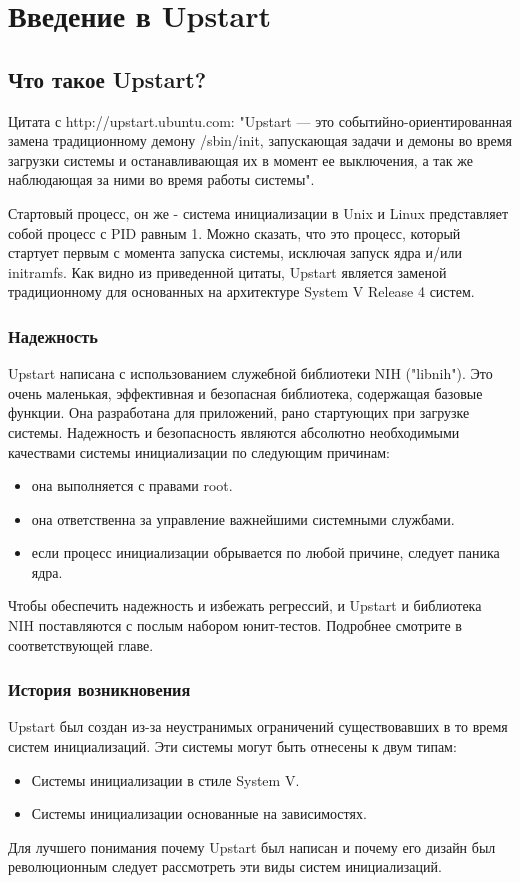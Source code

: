 \chapter{Введение в Upstart} \label{sec:Introduction}

\section{Что такое Upstart?}

Цитата с http://upstart.ubuntu.com: "Upstart --- это событийно-ориентированная замена традиционному демону /sbin/init, запускающая задачи и демоны во время загрузки системы и останавливающая их в момент ее выключения, а так же наблюдающая за ними во время работы системы".

Стартовый процесс, он же - система инициализации в Unix и Linux представляет собой процесс с PID равным 1. Можно сказать, что это процесс, который стартует первым с момента запуска системы, исключая запуск ядра и/или initramfs. Как видно из приведенной цитаты, Upstart является заменой традиционному для основанных на архитектуре System V Release 4 систем.

\subsection{Надежность}

Upstart написана с использованием служебной библиотеки NIH ("libnih"). Это очень маленькая, эффективная и безопасная библиотека, содержащая базовые функции. Она разработана для приложений, рано стартующих при загрузке системы. Надежность и безопасность являются абсолютно необходимыми качествами системы инициализации по следующим причинам:
\begin{itemize}
\item она выполняется с правами root.
\item она ответственна за управление важнейшими системными службами.
\item если процесс инициализации обрывается по любой причине, следует паника ядра.
\end{itemize}
Чтобы обеспечить надежность и избежать регрессий, и Upstart и библиотека NIH поставляются с послым набором юнит-тестов. Подробнее смотрите в соответствующей главе.
\subsection{История возникновения}
Upstart был создан из-за неустранимых ограничений существовавших в то время систем инициализаций. Эти системы могут быть отнесены к двум типам: \begin{itemize}
\item Системы инициализации в стиле System V.
\item Системы инициализации основанные на зависимостях.
\end{itemize}
Для лучшего понимания почему Upstart был написан и почему его дизайн был революционным следует рассмотреть эти виды систем инициализаций.
